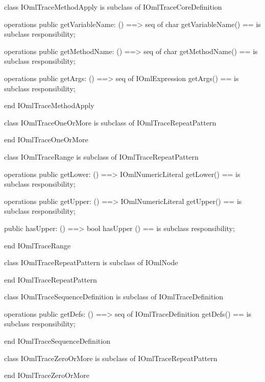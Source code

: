 \begin{vdm_al}
class IOmlTraceMethodApply
 is subclass of IOmlTraceCoreDefinition

operations
  public getVariableName: () ==> seq of char
  getVariableName() == is subclass responsibility;

operations
  public getMethodName: () ==> seq of char
  getMethodName() == is subclass responsibility;

operations
  public getArgs: () ==> seq of IOmlExpression
  getArgs() == is subclass responsibility;

end IOmlTraceMethodApply
\end{vdm_al}

\begin{vdm_al}
class IOmlTraceOneOrMore
 is subclass of IOmlTraceRepeatPattern

end IOmlTraceOneOrMore
\end{vdm_al}

\begin{vdm_al}
class IOmlTraceRange
 is subclass of IOmlTraceRepeatPattern

operations
  public getLower: () ==> IOmlNumericLiteral
  getLower() == is subclass responsibility;

operations
  public getUpper: () ==> IOmlNumericLiteral
  getUpper() == is subclass responsibility;

  public hasUpper: () ==> bool
  hasUpper () == is subclass responsibility;

end IOmlTraceRange
\end{vdm_al}

\begin{vdm_al}
class IOmlTraceRepeatPattern
 is subclass of IOmlNode

end IOmlTraceRepeatPattern
\end{vdm_al}

\begin{vdm_al}
class IOmlTraceSequenceDefinition
 is subclass of IOmlTraceDefinition

operations
  public getDefs: () ==> seq of IOmlTraceDefinition
  getDefs() == is subclass responsibility;

end IOmlTraceSequenceDefinition
\end{vdm_al}

\begin{vdm_al}
class IOmlTraceZeroOrMore
 is subclass of IOmlTraceRepeatPattern

end IOmlTraceZeroOrMore
\end{vdm_al}

